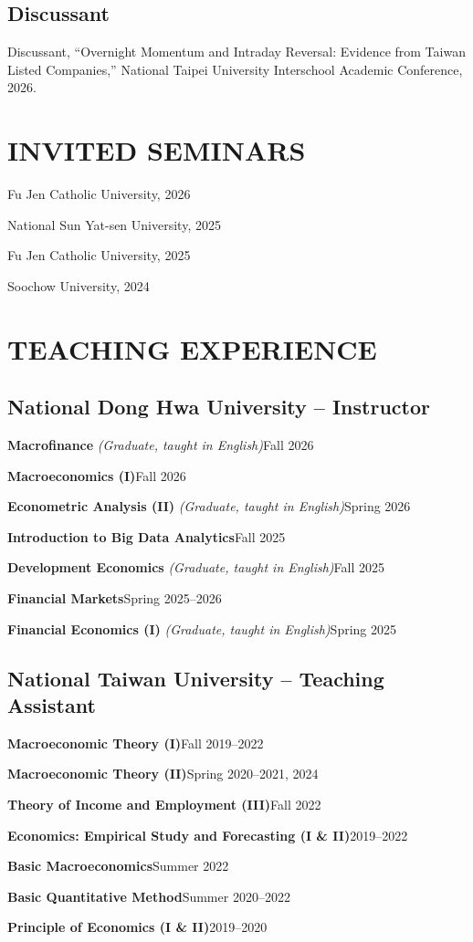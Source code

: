 \documentclass{article}
\newcommand{\cvsection}[1]{\section*{\MakeUppercase{#1}}}
\newcommand{\cvsubsection}[1]{\subsection*{\rmfamily\hspace{1.6em}#1}}
\begin{document}
\cvsubsection{Discussant}

\begin{cvlist}
    \item Discussant, “Overnight Momentum and Intraday Reversal: Evidence from Taiwan Listed Companies,” National Taipei University Interschool Academic Conference, 2026.
\end{cvlist}

\cvsection{Invited Seminars}

\begin{cvlist}
    \item Fu Jen Catholic University, 2026
    \item National Sun Yat-sen University, 2025
    \item Fu Jen Catholic University, 2025
    \item Soochow University, 2024
\end{cvlist}


\cvsection{Teaching Experience}

\cvsubsection{National Dong Hwa University -- Instructor}

\begin{cvlist}[leftmargin=0pt]
    \item \textbf{Macrofinance} \textit{(Graduate, taught in English)}\hfill Fall 2026
    \item \textbf{Macroeconomics (I)}\hfill Fall 2026
    \item \textbf{Econometric Analysis (II)} \textit{(Graduate, taught in English)}\hfill Spring 2026
    \item \textbf{Introduction to Big Data Analytics}\hfill Fall 2025
    \item \textbf{Development Economics} \textit{(Graduate, taught in English)}\hfill Fall 2025
    \item \textbf{Financial Markets}\hfill Spring 2025--2026
    \item \textbf{Financial Economics (I)} \textit{(Graduate, taught in English)}\hfill Spring 2025
\end{cvlist}

\cvsubsection{National Taiwan University -- Teaching Assistant}

\begin{cvlist}[leftmargin=0pt]
    \item \textbf{Macroeconomic Theory (I)}\hfill Fall 2019--2022
    \item \textbf{Macroeconomic Theory (II)}\hfill Spring 2020--2021, 2024
    \item \textbf{Theory of Income and Employment (III)}\hfill Fall 2022
    \item \textbf{Economics: Empirical Study and Forecasting (I \& II)}\hfill 2019--2022
    \item \textbf{Basic Macroeconomics}\hfill Summer 2022
    \item \textbf{Basic Quantitative Method}\hfill Summer 2020--2022
    \item \textbf{Principle of Economics (I \& II)}\hfill 2019--2020
\end{cvlist}
\end{document}
